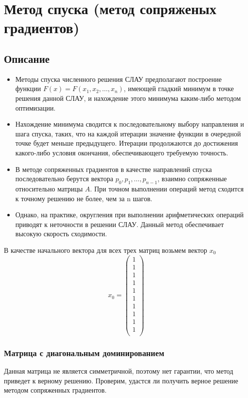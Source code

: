 \documentclass[../../report.tex]{subfiles}
\begin{document}
\chapter{Метод спуска (метод сопряженых градиентов)}

\section{Описание}
\begin{itemize}
  \item Методы спуска численного решения СЛАУ предполагают построение функции $F(x)=F(x_1, x_2, \dots, x_n)$, 
имеющей гладкий минимум в точке решения данной СЛАУ, и нахождение этого
минимума каким-либо методом оптимизации.

  \item Нахождение минимума сводится к последовательному выбору направления и шага спуска, таких, что на каждой итерации значение
функции в очередной точке будет меньше предыдущего. Итерации продолжаются до достижения
какого-либо условия окончания, обеспечивающего требуемую точность.

  \item В методе сопряженных градиентов в качестве направлений спуска последовательно берутся
вектора $p_0, p_1, \dots, p_{n-1}$, взаимно сопряженные относительно матрицы $A$. При точном выполнении
операций метод сходится к точному решению не более, чем за n шагов. 

  \item Однако, на практике, округления при выполнении арифметических операций приводят к неточности в решении СЛАУ.
Данный метод обеспечивает высокую скорость сходимости.
\end{itemize}

В качестве начального вектора для всех трех матриц возьмем вектор $x_0$
\[
x_0 =
\begin{pmatrix}
  1 \\
  1 \\
  1 \\
  1 \\
  1 \\
  1 \\
  1 \\
  1 \\
  1 \\
  1 \\
\end{pmatrix}
\]

\subsection{Матрица с диагональным доминированием}
Данная матрица не является симметричной, поэтому нет гарантии, что метод приведет к верному
решению. Проверим, удастся ли получить верное решение методом сопряженных градиентов.
\end{document}
